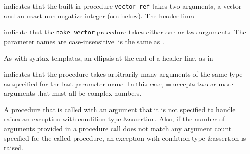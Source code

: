 \noindent{}\unpenalty

indicates that the built-in procedure {\tt vector-ref} takes
two arguments, a vector  and an exact non-negative integer
 (see below).  The header lines

\noindent%
\unpenalty

indicate that the {\tt make-vector} procedure takes
either one or two arguments.  The parameter names are
case-insensitive:  is the same as .

As with syntax templates, an ellipsis \dotsfoo{} at the end of a header
line, as in

\noindent{}\unpenalty

indicates that the procedure takes arbitrarily many arguments of the
same type as specified for the last parameter name.  In this case,
{\cf =} accepts two or more arguments that must all be complex
numbers.

\label{typeconventions}
A procedure that is called with an argument that it is not
specified to handle raises an exception with condition type
{\cf\&assertion}.  Also, if the number of arguments provided in
a procedure call does not match any argument count specified for the
called procedure, an exception with condition type {\cf\&assertion}
is raised.

